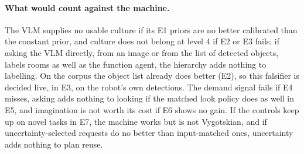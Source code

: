 \paragraph{What would count against the machine.}
\label{sec:experiments:against}

The VLM supplies no usable culture if its E1 priors are no better calibrated than the constant prior, and culture
does not belong at level 4 if E2 or E3 fails; if asking the VLM directly, from an image or from the
list of detected objects, labels rooms as well as the function agent, the hierarchy adds nothing to labelling. On
the corpus the object list already does better (E2), so this falsifier is decided live, in E3, on the robot's own
detections. The demand signal fails if E4 misses, asking adds nothing to
looking if the matched look policy does as well in E5, and imagination is not worth its cost if E6 shows no gain. If
the controls keep up on novel tasks in E7, the machine works but is not Vygotskian, and if uncertainty-selected
requests do no better than input-matched ones, uncertainty adds nothing to plan reuse.
